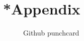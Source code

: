 \appendix
\ifdefined\godzilla
  \chapter{*Appendix}
  \begin{sidewaysfigure}
    \centering
    \def\svgwidth{\columnwidth}
    
    \caption{Github punchcard}
  \end{sidewaysfigure}
\fi
